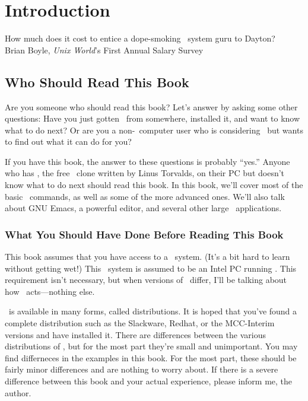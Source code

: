 \chapter{Introduction}

\begin{fortune}
How much does it cost to entice a dope-smoking \unix\ system guru to
Dayton?\\ 
\raggedleft Brian Boyle, {\sl Unix World\/}'s 
First Annual Salary Survey
\end{fortune}

\section{Who Should Read This Book}

Are you someone who should read this book?  Let's answer by asking some
other questions: Have you just gotten \linux\ from somewhere, installed it,
and want to know what to do next?  Or are you a non-\unix\ computer user
who is considering \linux\ but wants to find out what it can do for you?

If you have this book, the answer to these questions is probably
``yes.''  Anyone who has \linux, the free \unix\ clone written by
Linus Torvalds, on their PC but doesn't know
what to do next should read this book.  In this book, we'll cover most
of the basic \unix\ commands, as well as some of the more advanced
ones.  We'll also talk about GNU Emacs, a powerful
editor, and several other large \unix\ applications.

\subsection{What You Should Have Done Before Reading This Book}

This book assumes that you have access to a \unix\ system.  (It's a
bit hard to learn without getting wet!) This \unix\ system is assumed
to be an Intel PC running \linux.  This requirement isn't
necessary, but when versions of \unix\ differ, I'll be talking about
how \linux\ acts---nothing else.

\linux\ is available in many forms, called distributions.  It is hoped
that you've found a complete distribution such as the Slackware,
Redhat, or the MCC-Interim versions and have installed it.  There
are differences between the various distributions of \linux, but for
the most part they're small and unimportant.  You may find differneces
in the examples in this book.  For the most part, these should be
fairly minor differences and are nothing to worry about.  If there is
a severe difference between this book and your actual experience,
please inform me, the author.

